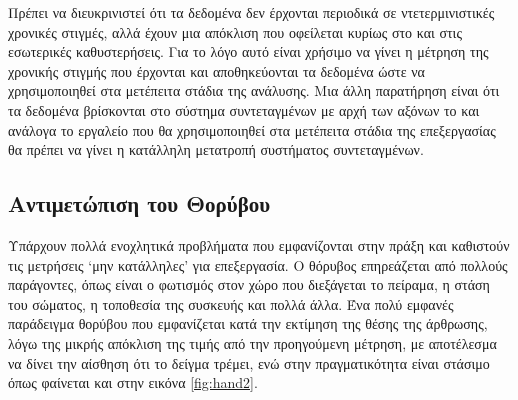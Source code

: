 Πρέπει να διευκρινιστεί ότι τα δεδομένα δεν έρχονται περιοδικά σε ντετερμινιστικές χρονικές στιγμές, αλλά έχουν μια απόκλιση που οφείλεται κυρίως στο  και στις εσωτερικές καθυστερήσεις. Για το λόγο αυτό είναι χρήσιμο να γίνει η μέτρηση της χρονικής στιγμής που έρχονται και αποθηκεύονται τα δεδομένα ώστε να χρησιμοποιηθεί στα μετέπειτα στάδια της ανάλυσης. Μια άλλη παρατήρηση είναι ότι τα δεδομένα βρίσκονται στο σύστημα συντεταγμένων με αρχή των αξόνων το  και ανάλογα το εργαλείο που θα χρησιμοποιηθεί στα μετέπειτα στάδια της επεξεργασίας θα πρέπει να γίνει η κατάλληλη μετατροπή συστήματος συντεταγμένων.

\subsection{Αντιμετώπιση του Θορύβου}

Υπάρχουν πολλά ενοχλητικά προβλήματα που εμφανίζονται στην πράξη και καθιστούν τις μετρήσεις \lq μην κατάλληλες\rq\: για επεξεργασία. Ο θόρυβος επηρεάζεται από πολλούς παράγοντες, όπως είναι ο φωτισμός στον χώρο που διεξάγεται το πείραμα, η στάση του σώματος, η τοποθεσία της συσκευής και πολλά άλλα. Ένα πολύ εμφανές παράδειγμα θορύβου που εμφανίζεται κατά την εκτίμηση της θέσης της άρθρωσης, λόγω της μικρής απόκλιση της τιμής από την προηγούμενη μέτρηση, με αποτέλεσμα να δίνει την αίσθηση ότι το δείγμα τρέμει, ενώ στην πραγματικότητα είναι στάσιμο όπως φαίνεται και στην εικόνα \ref{fig:hand2}.

